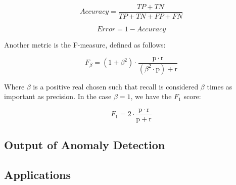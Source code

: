 \begin{equation}
	Accuracy = \frac{TP+TN}{TP+TN+FP+FN}
\end{equation}

\begin{equation}
	Error = 1 - Accuracy
\end{equation}

Another metric is the F-measure, defined as follows:

\begin{equation}
	F_\beta = (1 + \beta^2) \cdot \frac{\mathrm{p} \cdot \mathrm{r}}{(\beta^2 \cdot \mathrm{p}) + \mathrm{r}}
\end{equation}

Where $\beta$ is a positive real chosen such that recall is considered $\beta$ times as important as precision. In the case $\beta = 1$, we have the $F_1$ score:

\begin{equation}
	F_1 = 2 \cdot \frac{\mathrm{p} \cdot \mathrm{r}}{\mathrm{p} + \mathrm{r}}
\end{equation}



\subsection{Output of Anomaly Detection}

\subsection{Applications}


